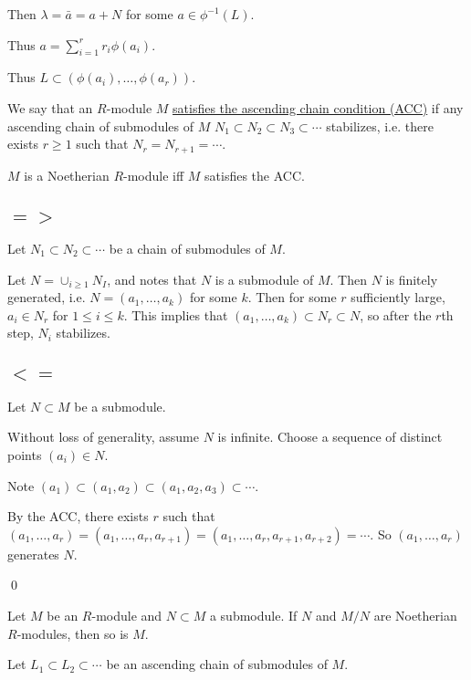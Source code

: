 \documentclass[x11names,reqno,14pt]{extarticle}
\begin{document}
Then $\lambda = \bar{a} = a + N$ for some $a \in \phi^{-1}(L)$. 

Thus $a = \sum_{i=1}^rr_i\phi(a_i)$. 

Thus $L \subset (\phi(a_i),\dots,\phi(a_r))$.


We say that an $R$-module $M$ \underline{satisfies the ascending chain condition (ACC)} if any ascending chain of submodules of $M$ $N_1 \subset N_2 \subset N_3 \subset \cdots $ stabilizes, i.e. there exists $r \geq 1$ such that $N_r = N_{r + 1} = \cdots$. 

\thm

$M$ is a Noetherian $R$-module iff $M$ satisfies the ACC. 

\proof

\subsection*{$=>$}

Let $N_1 \subset N_2 \subset \cdots$ be a chain of submodules of $M$. 

Let $N = \cup_{i\geq 1}N_I$, and notes that $N$ is a submodule of $M$. Then $N$ is finitely generated, i.e. $N = (a_1, \dots, a_k)$ for some $k$. Then for some $r$ sufficiently large, $a_i \in N_r$ for $1 \leq i \leq k$. This implies that $(a_1, \dots, a_k) \subset N_r \subset N$, so after the $r$th step, $N_i$ stabilizes. 

\subsection*{$<=$}

Let $N \subset M$ be a submodule. 

Without loss of generality, assume $N$ is infinite. Choose a sequence of distinct points $(a_i) \in N$. 

Note $(a_1)\subset (a_1, a_2) \subset (a_1, a_2, a_3) \subset \cdots $. 

By the ACC, there exists $r$ such that $(a_1, \dots, a_r) = (a_1, \dots, a_r, a_{r + 1}) = (a_1, \dots, a_r, a_{r + 1}, a_{r + 2}) = \cdots$. So $(a_1, \dots, a_r)$ generates $N$. 

\qed

\prop

Let $M$ be an $R$-module and $N\subset M$ a submodule. If $N$ and $M/N$ are Noetherian $R$-modules, then so is $M$. 

\proof

Let $L_1 \subset L_2 \subset \cdots$ be an ascending chain of submodules of $M$.
\end{document}
